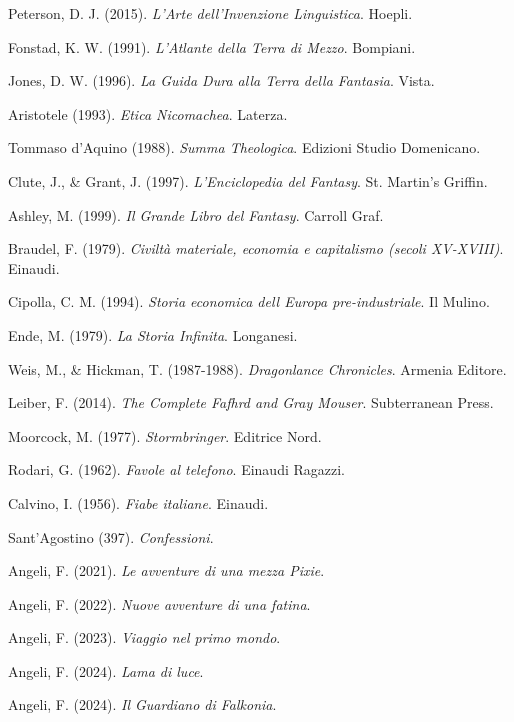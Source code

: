 Peterson, D. J. (2015).
\textit{L'Arte dell'Invenzione Linguistica}.
Hoepli.

Fonstad, K. W. (1991).
\textit{L'Atlante della Terra di Mezzo}.
Bompiani.

Jones, D. W. (1996).
\textit{La Guida Dura alla Terra della Fantasia}.
Vista.

Aristotele (1993).
\textit{Etica Nicomachea}.
Laterza.

Tommaso d'Aquino (1988).
\textit{Summa Theologica}.
Edizioni Studio Domenicano.

Clute, J., \& Grant, J. (1997).
\textit{L'Enciclopedia del Fantasy}.
St. Martin's Griffin.

Ashley, M. (1999).
\textit{Il Grande Libro del Fantasy}.
Carroll Graf.

Braudel, F. (1979).
\textit{Civiltà materiale, economia e capitalismo (secoli XV-XVIII)}.
Einaudi.

Cipolla, C. M. (1994).
\textit{Storia economica dell Europa pre-industriale}.
Il Mulino.

Ende, M. (1979).
\textit{La Storia Infinita}.
Longanesi.

Weis, M., \& Hickman, T. (1987-1988).
\textit{Dragonlance Chronicles}.
Armenia Editore.

Leiber, F. (2014).
\textit{The Complete Fafhrd and Gray Mouser}.
Subterranean Press.

Moorcock, M. (1977).
\textit{Stormbringer}.
Editrice Nord.

Rodari, G. (1962).
\textit{Favole al telefono}.
Einaudi Ragazzi.

Calvino, I. (1956).
\textit{Fiabe italiane}.
Einaudi.

Sant'Agostino (397).
\textit{Confessioni}.

Angeli, F. (2021).
\textit{Le avventure di una mezza Pixie}.

Angeli, F. (2022).
\textit{Nuove avventure di una fatina}.

Angeli, F. (2023).
\textit{Viaggio nel primo mondo}.

Angeli, F. (2024).
\textit{Lama di luce}.

Angeli, F. (2024).
\textit{Il Guardiano di Falkonia}.
